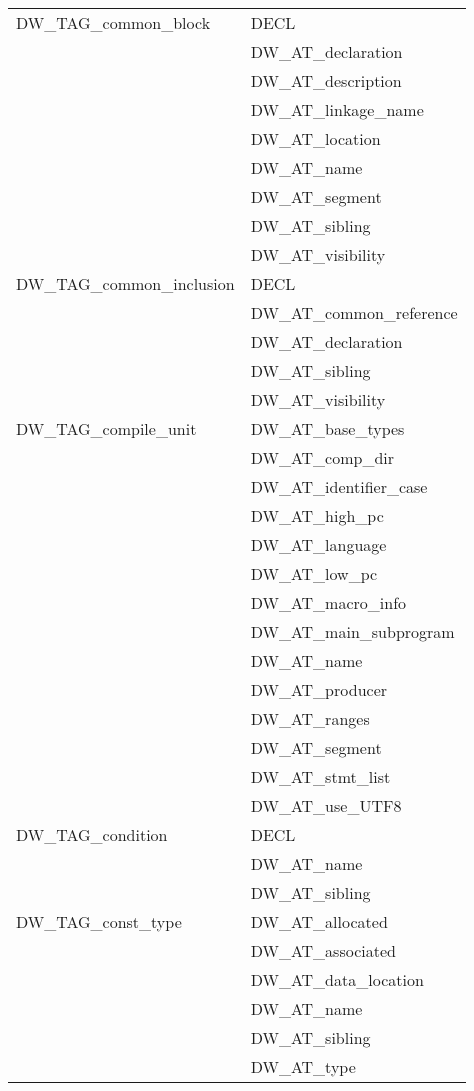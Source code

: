 \begin{longtable}{l|p{8cm}}
DW\_TAG\_common\_block
&DECL \\
&DW\_AT\_declaration \\
&DW\_AT\_description \\
&DW\_AT\_linkage\_name \\
&DW\_AT\_location \\
&DW\_AT\_name \\
&DW\_AT\_segment \\
&DW\_AT\_sibling \\
&DW\_AT\_visibility \\

DW\_TAG\_common\_inclusion
&DECL \\
&DW\_AT\_common\_reference \\
&DW\_AT\_declaration \\
&DW\_AT\_sibling \\
&DW\_AT\_visibility \\


DW\_TAG\_compile\_unit
&DW\_AT\_base\_types \\
&DW\_AT\_comp\_dir \\
&DW\_AT\_identifier\_case \\
&DW\_AT\_high\_pc \\
&DW\_AT\_language \\
&DW\_AT\_low\_pc \\
&DW\_AT\_macro\_info \\
&DW\_AT\_main\_subprogram \\
&DW\_AT\_name \\
&DW\_AT\_producer \\
&DW\_AT\_ranges \\
&DW\_AT\_segment \\
&DW\_AT\_stmt\_list \\
&DW\_AT\_use\_UTF8 \\

DW\_TAG\_condition
&DECL \\
&DW\_AT\_name \\
&DW\_AT\_sibling \\

DW\_TAG\_const\_type
&DW\_AT\_allocated \\
&DW\_AT\_associated \\
&DW\_AT\_data\_location \\
&DW\_AT\_name \\
&DW\_AT\_sibling \\
&DW\_AT\_type \\


\end{longtable}
